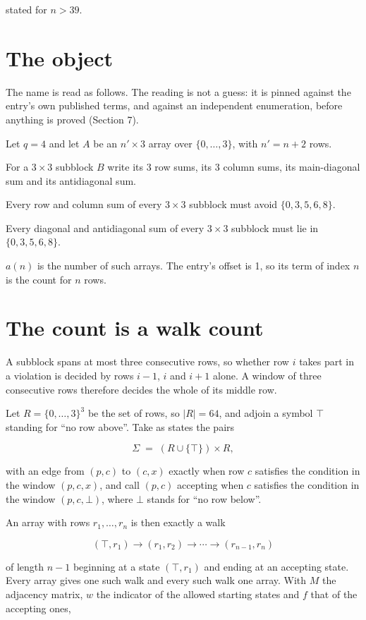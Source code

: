 \documentclass[11pt]{article}
\theoremstyle{definition}
\begin{document}
stated for $n > 39$.

\section{The object}

The name is read as follows. The reading is not a guess: it is pinned against the entry's own published terms, and against an independent enumeration, before anything is proved (Section 7).

Let $q = 4$ and let $A$ be an $n' \times 3$ array over $\{0,\dots,3\}$, with $n' = n + 2$ rows.

For a $3\times3$ subblock $B$ write its 3 row sums, its 3 column sums, its main-diagonal sum and its antidiagonal sum.

Every row and column sum of every $3\times3$ subblock must avoid $\{0, 3, 5, 6, 8\}$.

Every diagonal and antidiagonal sum of every $3\times3$ subblock must lie in $\{0, 3, 5, 6, 8\}$.

$a(n)$ is the number of such arrays. The entry's offset is 1, so its term of index $n$ is the count for $n$ rows.

\section{The count is a walk count}

A subblock spans at most three consecutive rows, so whether row $i$ takes part in a violation is decided by rows $i-1$, $i$ and $i+1$ alone. A window of three consecutive rows therefore decides the whole of its middle row.

Let $R = \{0,\dots,3\}^{3}$ be the set of rows, so $|R| = 64$, and adjoin a symbol $\top$ standing for ``no row above''. Take as states the pairs

\[\Sigma \;=\; (R \cup \{\top\}) \times R,\]

with an edge from $(p,c)$ to $(c,x)$ exactly when row $c$ satisfies the condition in the window $(p,c,x)$, and call $(p,c)$ accepting when $c$ satisfies the condition in the window $(p,c,\bot)$, where $\bot$ stands for ``no row below''.

An array with rows $r_1,\dots,r_n$ is then exactly a walk

\[(\top,r_1) \to (r_1,r_2) \to \cdots \to (r_{n-1},r_n)\]

of length $n-1$ beginning at a state $(\top,r_1)$ and ending at an accepting state. Every array gives one such walk and every such walk one array. With $M$ the adjacency matrix, $w$ the indicator of the allowed starting states and $f$ that of the accepting ones,
\end{document}
